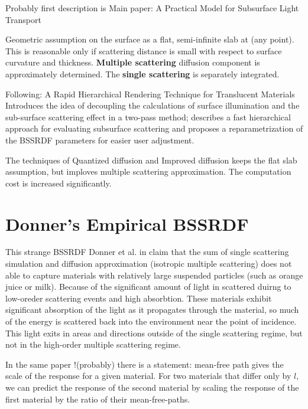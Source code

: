 Probably first description is \cite{Stam1995}
Main paper: A Practical Model for Subsurface Light Transport \cite{Jensen:2001:PMS:383259.383319}

Geometric assumption on the surface as a flat, semi-infinite slab at (any
point). This is reasonable only if scattering distance is small with respect to
surface curvature and thickness. \textbf{Multiple scattering} diffusion
component is approximately determined. The \textbf{single scattering} is
separately integrated.

Following: A Rapid Hierarchical Rendering Technique for Translucent Materials\\
\cite{Jensen:2002:RHR:566570.566619} Introduces the idea of decoupling the calculations of surface
illumination and the sub-surface scattering effect in a two-pass method;
describes a fast hierarchical approach for evaluating subsurface scattering
and proposes a reparametrization of the BSSRDF parameters for easier user adjustment.

The techniques of Quantized diffusion \cite{D'Eon:2011:QMR:1964921.1964951} and
Improved diffusion \cite{Habel:2013:PBD:2600890.2600896} keeps the flat slab
assumption, but imploves multiple scattering approximation. The computation cost
is increased significantly.

\section{Donner's Empirical BSSRDF}
This strange \gls{BSSRDF}
Donner et al. in \cite{Donner:2009:EBM} claim that the sum of single scattering
simulation and diffusion approximation (isotropic multiple scattering) does not
able to capture materials with relatively large suspended particles (such as
orange juice or milk). Because of the significant amount of light in scattered
duirng to low-oreder scattering events and high absorbtion.
These materials exhibit significant absorption of the light as it propagates
through the material, so much of the energy is scattered back into
the environment near the point of incidence. This light exits in areas and
directions outside of the single scattering regime, but not in the high-order
multiple scattering regime.

In the same paper !(probably) there is a statement:
mean-free path gives the scale of the response for a given material. For two
materials that differ only by $l$, we can predict the response of the second
material by scaling the response of the first material by the ratio of their
mean-free-paths.

